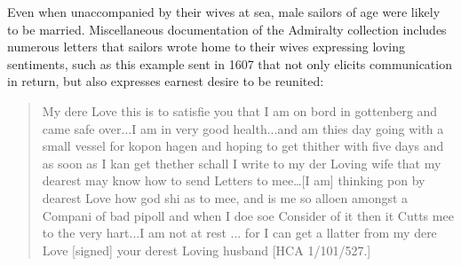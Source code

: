   Even when unaccompanied by their wives at sea, male sailors of age were likely to be married. Miscellaneous documentation of the Admiralty collection includes numerous letters that sailors wrote home to their wives expressing loving sentiments, such as this example sent in 1607 that not only elicits communication in return, but also expresses earnest desire to be reunited:

\begin{quotation}
My dere Love this is to satisfie you that I am on bord in gottenberg and came safe over...I am in very good health...and am thies day going with a small vessel for kopon hagen and hoping to get thither with five days and as soon as I kan get thether schall I write to my der Loving wife that my dearest may know how to send Letters to mee…[I am] thinking pon by dearest Love how god shi as to mee, and is me so alloen amongst a Compani of bad pipoll and when I doe soe Consider of it then it Cutts mee to the very hart...I am not at rest ... for I can get a llatter from my dere Love [signed] your derest Loving husband [HCA 1/101/527.]\end{quotation}

